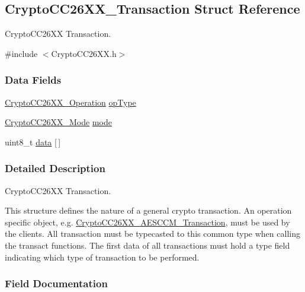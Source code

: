 \subsection{Crypto\-C\-C26\-X\-X\-\_\-\-Transaction Struct Reference}
\label{struct_crypto_c_c26_x_x___transaction}


Crypto\-C\-C26\-X\-X Transaction.  




{\ttfamily \#include $<$Crypto\-C\-C26\-X\-X.\-h$>$}

\subsubsection*{Data Fields}
\begin{DoxyCompactItemize}
\item 
\hyperlink{_crypto_c_c26_x_x_8h_a28465385e5b45efecc00f2015605f970}{Crypto\-C\-C26\-X\-X\-\_\-\-Operation} \hyperlink{struct_crypto_c_c26_x_x___transaction_a40fe1424c6534f76622ff56ed4f2ab42}{op\-Type}
\item 
\hyperlink{_crypto_c_c26_x_x_8h_abf86c8ac428559f00fed3299d439e2cd}{Crypto\-C\-C26\-X\-X\-\_\-\-Mode} \hyperlink{struct_crypto_c_c26_x_x___transaction_afe088678af719e3dc46c3196334b9398}{mode}
\item 
uint8\-\_\-t \hyperlink{struct_crypto_c_c26_x_x___transaction_a3eb99656cb17d1c68fc28d42b5b392dd}{data} \mbox{[}$\,$\mbox{]}
\end{DoxyCompactItemize}


\subsubsection{Detailed Description}
Crypto\-C\-C26\-X\-X Transaction. 

This structure defines the nature of a general crypto transaction. An operation specific object, e.\-g. \hyperlink{struct_crypto_c_c26_x_x___a_e_s_c_c_m___transaction}{Crypto\-C\-C26\-X\-X\-\_\-\-A\-E\-S\-C\-C\-M\-\_\-\-Transaction}, must be used by the clients. All transaction must be typecasted to this common type when calling the transact functions. The first data of all transactions must hold a type field indicating which type of transaction to be performed. 

\subsubsection{Field Documentation}

